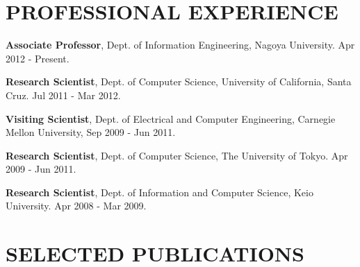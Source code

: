 \documentclass[10pt,letterpaper]{article}
\renewenvironment{itemize}{
  \begin{list}{}{
    \setlength{\leftmargin}{1.5em}
    \setlength{\itemsep}{0.25em}
    \setlength{\parskip}{0pt}
    \setlength{\parsep}{0.25em}
  }
}{
  \end{list}
}
\begin{document}
\section*{PROFESSIONAL EXPERIENCE}

\begin{itemize}

\item \textbf{Associate Professor}, Dept. of Information
      Engineering, Nagoya University. Apr 2012 - Present.

\item \textbf{Research Scientist}, Dept. of Computer Science,
      University of California, Santa Cruz. Jul 2011 - Mar 2012.

\item \textbf{Visiting Scientist}, Dept. of Electrical and
      Computer Engineering, Carnegie Mellon University, Sep 2009 - Jun
      2011.

\item \textbf{Research Scientist}, Dept. of Computer Science, The
      University of Tokyo. Apr 2009 - Jun 2011.

\item \textbf{Research Scientist}, Dept. of Information and
      Computer Science, Keio University. Apr 2008 - Mar 2009.

\end{itemize}

\section*{SELECTED PUBLICATIONS}
\end{document}
